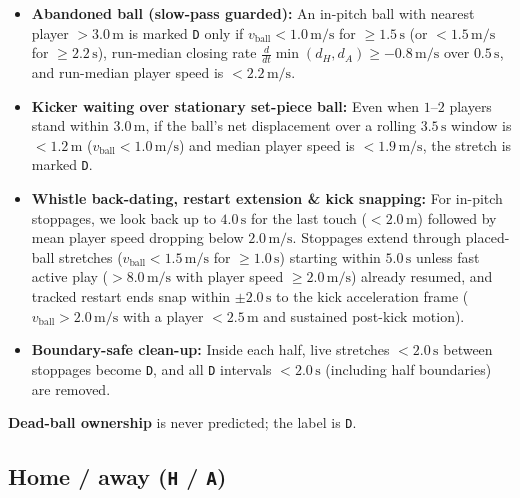 \documentclass[11pt,a4paper]{article}
\newcommand{\code}[1]{\texttt{#1}}
\begin{document}
\begin{itemize}
        walking stops ($< 1.35\,\text{m/s}$ mean and median player speed for $\ge 3.0\,\text{s}$
        with slow ball $< 5.0\,\text{m/s}$ and no live phase tag) also mark \code{D} when a dead
        ball is walked/carried to the restart spot.
  \item \textbf{Abandoned ball (slow-pass guarded):} An in-pitch ball with nearest player
        $> 3.0\,\text{m}$ is marked \code{D} only if $v_{\text{ball}} < 1.0\,\text{m/s}$ for
        $\ge 1.5\,\text{s}$ (or $< 1.5\,\text{m/s}$ for $\ge 2.2\,\text{s}$), run-median closing
        rate $\frac{d}{dt}\min(d_H, d_A) \ge -0.8\,\text{m/s}$ over $0.5\,\text{s}$, and run-median
        player speed is $< 2.2\,\text{m/s}$.
  \item \textbf{Kicker waiting over stationary set-piece ball:} Even when $1$--$2$ players stand
        within $3.0\,\text{m}$, if the ball's net displacement over a rolling $3.5\,\text{s}$ window
        is $< 1.2\,\text{m}$ ($v_{\text{ball}} < 1.0\,\text{m/s}$) and median player speed is
        $< 1.9\,\text{m/s}$, the stretch is marked \code{D}.
  \item \textbf{Whistle back-dating, restart extension \& kick snapping:} For in-pitch stoppages,
        we look back up to $4.0\,\text{s}$ for the last touch ($< 2.0\,\text{m}$) followed by mean
        player speed dropping below $2.0\,\text{m/s}$. Stoppages extend through placed-ball
        stretches ($v_{\text{ball}} < 1.5\,\text{m/s}$ for $\ge 1.0\,\text{s}$) starting within
        $5.0\,\text{s}$ unless fast active play ($> 8.0\,\text{m/s}$ with player speed
        $\ge 2.0\,\text{m/s}$) already resumed, and tracked restart ends snap within $\pm 2.0\,\text{s}$
        to the kick acceleration frame ($v_{\text{ball}} > 2.0\,\text{m/s}$ with a player
        $< 2.5\,\text{m}$ and sustained post-kick motion).
  \item \textbf{Boundary-safe clean-up:} Inside each half, live stretches $< 2.0\,\text{s}$ between
        stoppages become \code{D}, and all \code{D} intervals $< 2.0\,\text{s}$ (including half
        boundaries) are removed.
\end{itemize}

\textbf{Dead-ball ownership} is never predicted; the label is \code{D}.

\subsection{Home / away (\code{H} / \code{A})}
\end{document}
